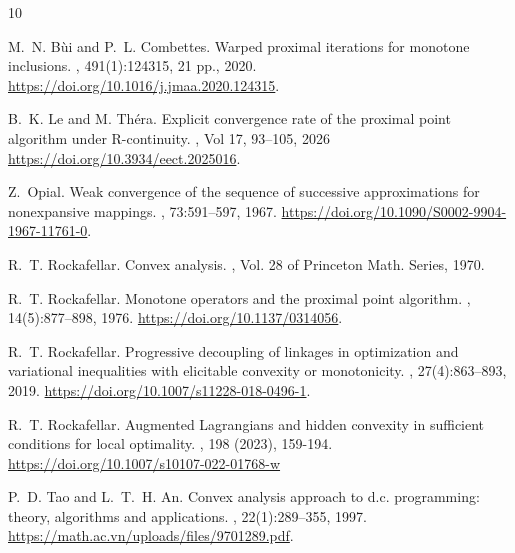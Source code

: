 \documentclass[11pt]{article}
\theoremstyle{definition}
\theoremstyle{definition}
\theoremstyle{definition}
\begin{document}
\begin{thebibliography}{10}

M.~N. B\`ui  and P.~L. Combettes.
\newblock Warped proximal iterations for monotone inclusions.
, 491(1):124315, 21 pp., 2020.
\newblock \url{https://doi.org/10.1016/j.jmaa.2020.124315}.

B.~K. Le and M. Th\'era.
\newblock Explicit convergence rate of the proximal point algorithm under R-continuity.
, Vol 17, 93--105, 2026 
\newblock \url{https://doi.org/10.3934/eect.2025016}.

Z.~Opial.
\newblock Weak convergence of the sequence of successive approximations for nonexpansive mappings.
, 73:591--597, 1967.
\newblock \url{https://doi.org/10.1090/S0002-9904-1967-11761-0}.


R.~T. Rockafellar.
\newblock Convex analysis.
, Vol. 28 of Princeton Math. Series, 1970.

R.~T. Rockafellar.
\newblock Monotone operators and the proximal point algorithm.
, 14(5):877--898, 1976.
\newblock \url{https://doi.org/10.1137/0314056}.

R.~T. Rockafellar.
\newblock Progressive decoupling of linkages in optimization and variational
  inequalities with elicitable convexity or monotonicity.
, 27(4):863--893, 2019.
\newblock \url{https://doi.org/10.1007/s11228-018-0496-1}.

R.~T. Rockafellar.
\newblock Augmented Lagrangians and hidden convexity in sufficient conditions for local optimality.
, 198 (2023), 159-194.
\newblock \url{https://doi.org/10.1007/s10107-022-01768-w}

P.~D. Tao and L.~T.~H. An.
\newblock Convex analysis approach to d.c. programming: theory, algorithms and
  applications.
, 22(1):289--355, 1997.
\newblock \url{https://math.ac.vn/uploads/files/9701289.pdf}.
\end{thebibliography}
\end{document}
